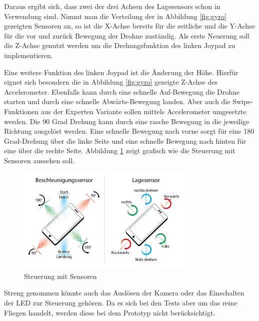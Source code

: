 \documentclass{article}
\begin{document}
Daraus ergibt sich, dass zwei der drei Achsen des Lagesensors schon in Verwendung sind. Nimmt man die Verteilung der in Abbildung \ref{fig:gyro} gezeigten Sensoren an, so ist die X-Achse bereits für die seitliche und die Y-Achse für die vor und zurück Bewegung der Drohne zuständig. Als erste Neuerung soll die Z-Achse genutzt werden um die Drehungsfunktion des linken Joypad zu implementieren. 

Eine weitere Funktion des linken Joypad ist die Änderung der Höhe. Hierfür eignet sich besondern die in Abbildung \ref{fig:gyro} gezeigte Z-Achse des Accelerometer. Ebenfalls kann durch eine schnelle Auf-Bewegung die Drohne starten und durch eine schnelle Abwärts-Bewegung landen. Aber auch die Swipe-Funktionen aus der Experten Variante sollen mittels Accelerometer umgesetzte werden. Die 90 Grad Drehung kann durch eine rasche Bewegung in die jeweilige Richtung ausgelöst werden. Eine schnelle Bewegung nach vorne sorgt für eine 180 Grad-Drehung über die linke Seite und eine schnelle Bewegung nach hinten für eine über die rechte Seite. Abbildung \ref{fig:gameplay} zeigt grafisch wie die Steuerung mit Sensoren aussehen soll. 

\begin{figure}
\begin{minipage}[b]{1.0\linewidth}
  \centering
\centerline{\includegraphics[width= 85mm]{gameplay}}
\end{minipage}
\caption{Steuerung mit Sensoren}
\label{fig:gameplay}
\end{figure}


Streng genommen könnte auch das Auslösen der Kamera oder das Einschalten der LED zur Steuerung gehören. Da es sich bei den Tests aber um das reine Fliegen handelt, werden diese bei dem Prototyp nicht berücksichtigt.
\end{document}
